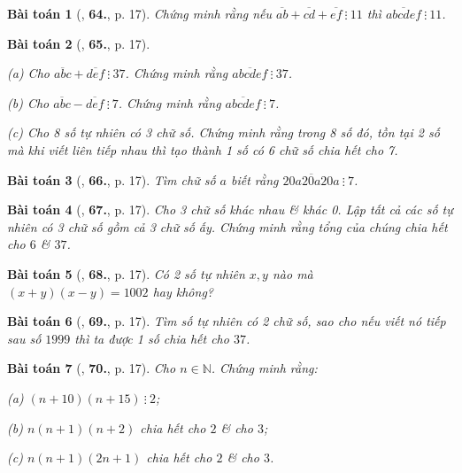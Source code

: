 \documentclass{article}
\numberwithin{equation}{section}
\newtheorem{baitoan}{Bài toán}[section]
\begin{document}
\begin{baitoan}[\cite{Binh_Toan_6_tap_1}, \textbf{64.}, p. 17]
	Chứng minh rằng nếu $\overline{ab} + \overline{cd} + \overline{ef}\ \vdots\ 11$ thì $\overline{abcdef}\ \vdots\ 11$.
\end{baitoan}

\begin{baitoan}[\cite{Binh_Toan_6_tap_1}, \textbf{65.}, p. 17]
	\begin{enumerate*}
		\item[(a)] Cho $\overline{abc} + \overline{def}\ \vdots\ 37$. Chứng minh rằng $\overline{abcdef}\ \vdots\ 37$.
		\item[(b)] Cho $\overline{abc} - \overline{def}\ \vdots\ 7$. Chứng minh rằng $\overline{abcdef}\ \vdots\ 7$.
		\item[(c)] Cho 8 số tự nhiên có 3 chữ số. Chứng minh rằng trong 8 số đó, tồn tại 2 số mà khi viết liên tiếp nhau thì tạo thành 1 số có 6 chữ số chia hết cho 7.
	\end{enumerate*}
\end{baitoan}

\begin{baitoan}[\cite{Binh_Toan_6_tap_1}, \textbf{66.}, p. 17]
	Tìm chữ số $a$ biết rằng $\overline{20a20a20a}\ \vdots\ 7$.
\end{baitoan}

\begin{baitoan}[\cite{Binh_Toan_6_tap_1}, \textbf{67.}, p. 17]
	Cho 3 chữ số khác nhau \& khác 0. Lập tất cả các số tự nhiên có 3 chữ số gồm cả 3 chữ số ấy. Chứng minh rằng tổng của chúng chia hết cho $6$ \& $37$.
\end{baitoan}

\begin{baitoan}[\cite{Binh_Toan_6_tap_1}, \textbf{68.}, p. 17]
	Có 2 số tự nhiên $x,y$ nào mà $(x + y)(x - y) = 1002$ hay không?
\end{baitoan}

\begin{baitoan}[\cite{Binh_Toan_6_tap_1}, \textbf{69.}, p. 17]
	Tìm số tự nhiên có 2 chữ số, sao cho nếu viết nó tiếp sau số $1999$ thì ta được 1 số chia hết cho $37$.
\end{baitoan}

\begin{baitoan}[\cite{Binh_Toan_6_tap_1}, \textbf{70.}, p. 17]
	Cho $n\in\mathbb{N}$. Chứng minh rằng:
	\begin{enumerate*}
		\item[(a)] $(n + 10)(n + 15)\ \vdots\ 2$;
		\item[(b)] $n(n + 1)(n + 2)$ chia hết cho $2$ \& cho $3$;
		\item[(c)] $n(n + 1)(2n + 1)$ chia hết cho $2$ \& cho $3$. 
	\end{enumerate*}
\end{baitoan}
\end{document}
